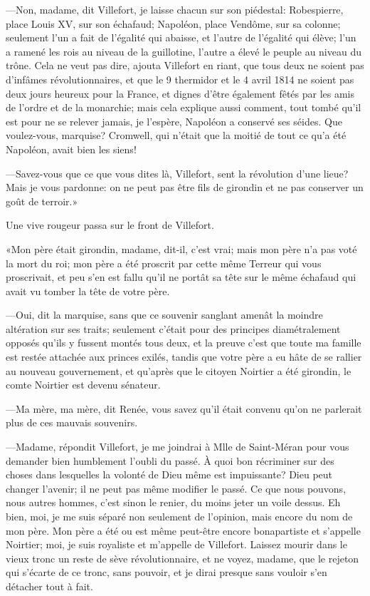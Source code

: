 —Non, madame, dit Villefort, je laisse chacun sur son piédestal: Robespierre, place Louis XV, sur son échafaud; Napoléon, place Vendôme, sur sa colonne; seulement l'un a fait de l'égalité qui abaisse, et l'autre de l'égalité qui élève; l'un a ramené les rois au niveau de la guillotine, l'autre a élevé le peuple au niveau du trône. Cela ne veut pas dire, ajouta Villefort en riant, que tous deux ne soient pas d'infâmes révolutionnaires, et que le 9 thermidor et le 4 avril 1814 ne soient pas deux jours heureux pour la France, et dignes d'être également fêtés par les amis de l'ordre et de la monarchie; mais cela explique aussi comment, tout tombé qu'il est pour ne se relever jamais, je l'espère, Napoléon a conservé ses séides. Que voulez-vous, marquise? Cromwell, qui n'était que la moitié de tout ce qu'a été Napoléon, avait bien les siens!

—Savez-vous que ce que vous dites là, Villefort, sent la révolution d'une lieue? Mais je vous pardonne: on ne peut pas être fils de girondin et ne pas conserver un goût de terroir.»

Une vive rougeur passa sur le front de Villefort.

«Mon père était girondin, madame, dit-il, c'est vrai; mais mon père n'a pas voté la mort du roi; mon père a été proscrit par cette même Terreur qui vous proscrivait, et peu s'en est fallu qu'il ne portât sa tête sur le même échafaud qui avait vu tomber la tête de votre père.

—Oui, dit la marquise, sans que ce souvenir sanglant amenât la moindre altération sur ses traits; seulement c'était pour des principes diamétralement opposés qu'ils y fussent montés tous deux, et la preuve c'est que toute ma famille est restée attachée aux princes exilés, tandis que votre père a eu hâte de se rallier au nouveau gouvernement, et qu'après que le citoyen Noirtier a été girondin, le comte Noirtier est devenu sénateur.

—Ma mère, ma mère, dit Renée, vous savez qu'il était convenu qu'on ne parlerait plus de ces mauvais souvenirs.

—Madame, répondit Villefort, je me joindrai à Mlle de Saint-Méran pour vous demander bien humblement l'oubli du passé. À quoi bon récriminer sur des choses dans lesquelles la volonté de Dieu même est impuissante? Dieu peut changer l'avenir; il ne peut pas même modifier le passé. Ce que nous pouvons, nous autres hommes, c'est sinon le renier, du moins jeter un voile dessus. Eh bien, moi, je me suis séparé non seulement de l'opinion, mais encore du nom de mon père. Mon père a été ou est même peut-être encore bonapartiste et s'appelle Noirtier; moi, je suis royaliste et m'appelle de Villefort. Laissez mourir dans le vieux tronc un reste de sève révolutionnaire, et ne voyez, madame, que le rejeton qui s'écarte de ce tronc, sans pouvoir, et je dirai presque sans vouloir s'en détacher tout à fait.

